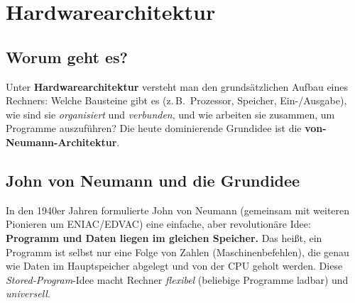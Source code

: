 \documentclass[../skript/main.tex]{subfiles}
\begin{document}
\chapter{Hardwarearchitektur}
\label{chap:hardwarearchitektur}

\section{Worum geht es?}
Unter \textbf{Hardwarearchitektur} versteht man den grundsätzlichen Aufbau eines Rechners:
Welche Bausteine gibt es (z.\,B.\ Prozessor, Speicher, Ein-/Ausgabe), wie sind sie
\emph{organisiert} und \emph{verbunden}, und wie arbeiten sie zusammen, um Programme auszuführen?
Die heute dominierende Grundidee ist die \textbf{von-Neumann-Architektur}.

\section{John von Neumann und die Grundidee}
In den 1940er Jahren formulierte John von Neumann (gemeinsam mit weiteren Pionieren um ENIAC/EDVAC)
eine einfache, aber revolutionäre Idee: \textbf{Programm und Daten liegen im gleichen Speicher.}
Das heißt, ein Programm ist selbst nur eine Folge von Zahlen (Maschinenbefehlen), die genau wie Daten
im Hauptspeicher abgelegt und von der CPU geholt werden. Diese \emph{Stored-Program}-Idee macht
Rechner \emph{flexibel} (beliebige Programme ladbar) und \emph{universell}.



\end{document}
